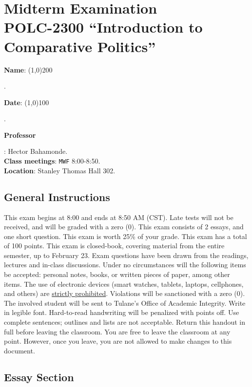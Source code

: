\documentclass{article}
\begin{document}
{\centering\section*{Midterm Examination\\POLC-2300 ``Introduction to Comparative Politics''}}

{\vspace{.5cm}\raggedright{\bf Name}: \line(1,0){200}}. %
{\vspace{.5cm}\hspace{4.5cm}\raggedright{\bf Date}: \line(1,0){100}}. %


{\vspace{.5cm}\raggedright \bf Professor}: Hector Bahamonde.\\
{\bf Class meetings}: \texttt{MWF} 8:00-8:50.\\
{\bf Location}: Stanley Thomas Hall 302.


\vspace{0.5cm}\subsection*{General Instructions}

This exam begins at 8:00 and ends at 8:50 AM (CST). Late tests will not be received, and will be graded with a zero (0). This exam consists of 2 essays, and one short question. This exam is worth 25\% of your grade. This exam has a total of 100 points. This exam is closed-book, covering material from the entire semester, up to February 23. Exam questions have been drawn from the readings, lectures and in-class discussions. Under no circumstances will the following items be accepted: personal notes, books, or written pieces of paper, among other items. The use of electronic devices (smart watches, tablets, laptops, cellphones, and others) are \underline{strictly prohibited}. Violations will be sanctioned with a zero (0). The involved student will be sent to Tulane's Office of Academic Integrity. Write in legible font.  Hard-to-read handwriting will be penalized with points off. Use complete sentences; outlines and lists are not acceptable. Return this handout in full before leaving the classroom. You are free to leave the classroom at any point. However, once you leave, you are not allowed to make changes to this document.


\subsection*{Essay Section}
\end{document}
